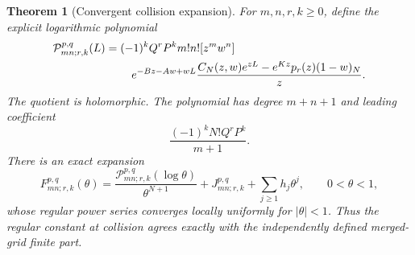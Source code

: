\documentclass[11pt,a4paper]{article}
\numberwithin{equation}{section}
\newtheorem{theorem}{Theorem}[section]
\theoremstyle{definition}
\theoremstyle{remark}
\begin{document}
\begin{theorem}[Convergent collision expansion]
\label{xid:cld:collision-expansion}
For $m,n,r,k\ge0$, define the explicit logarithmic polynomial
\begin{align}
 \mathcal P_{mn;r,k}^{p,q}(L)
 ={}&(-1)^kQ^rP^k m!n![z^mw^n]\notag\\
 &\quad e^{-Bz-Aw+wL}
       \frac{C_N(z,w)e^{zL}-e^{Kz}p_r(z)(1-w)_N}{z}.
 \label{xid:cld:collision-polynomial}
\end{align}
The quotient is holomorphic.  The polynomial has degree $m+n+1$ and
leading coefficient
\[
 \frac{(-1)^kN!Q^rP^k}{m+1}.
\]
There is an exact expansion
\begin{equation}
 F_{mn;r,k}^{p,q}(\theta)
 =\frac{\mathcal P_{mn;r,k}^{p,q}(\log\theta)}{\theta^{N+1}}
       +J_{mn;r,k}^{p,q}+\sum_{j\ge1}h_j\theta^j,
 \qquad 0<\theta<1,
 \label{xid:cld:collision-expansion-equation}
\end{equation}
whose regular power series converges locally uniformly for $|\theta|<1$.
Thus the regular constant at collision agrees exactly with the
independently defined merged-grid finite part.
\end{theorem}
\end{document}
